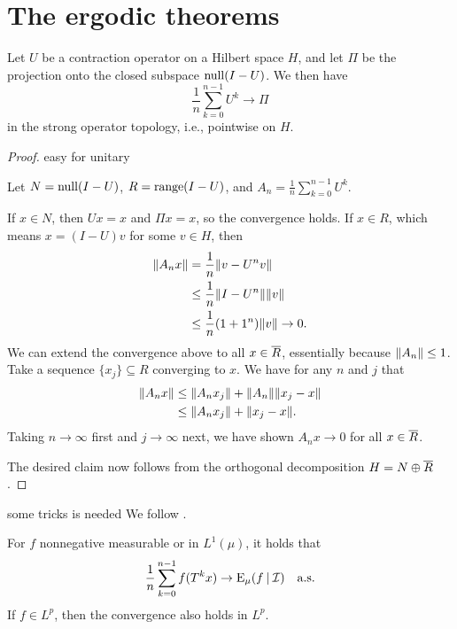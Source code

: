 \section{The ergodic theorems}

\begin{namedthm}
    Let $U$ be a contraction operator on a Hilbert space $H$, and let $\Pi$ be the projection onto the closed subspace $\operatorname{null}(I-U)$. We then have \[
        \frac{1}{n}\sum_{k=0}^{n-1} U^k \to \Pi
    \] in the strong operator topology, i.e., pointwise on $H$.
\end{namedthm}

\begin{proof}

    easy for unitary

    Let $N = \operatorname{null}(I - U)$, $R = \operatorname{range}(I - U)$, and $A_n = \frac{1}{n}\sum_{k=0}^{n-1} U^k$.

    If $x \in N$, then $Ux = x$ and $\Pi x = x$, so the convergence holds. If $x \in R$, which means $x = (I - U)v$ for some $v \in H$, then \begin{align*}
        \lVert A_n x \rVert & = \frac{1}{n}\lVert v - U^n v \rVert \\
        & \leq \frac{1}{n}\lVert I - U^n \rVert\lVert v \rVert\\
        & \leq \frac{1}{n}(1 + 1^n) \lVert v \rVert \to 0.
    \end{align*}
    We can extend the convergence above to all $x \in \overline{R}$, essentially because $\lVert A_n \rVert \leq 1$. Take a sequence $\{x_j\}\subseteq R$ converging to $x$. We have for any $n$ and $j$ that \begin{align*}
        \lVert A_n x \rVert & \leq \lVert A_n x_j \rVert + \lVert A_n \rVert\lVert x_j - x \rVert \\
        & \leq \lVert A_n x_j \rVert + \lVert x_j - x \rVert.
    \end{align*} Taking $n \to \infty$ first and $j \to \infty$ next, we have shown $A_n x \to 0$ for all $x \in \overline{R}$.

    The desired claim now follows from the orthogonal decomposition $H = N \oplus \overline{R}$.
\end{proof}

some tricks is needed We follow \cite[Lemma~14.1]{Taylor_2006}.

\begin{namedthm} \label{thm:Birkhoff-ergodic}
    For $f$ nonnegative measurable or in $L^1(\mu)$, it holds that \[
        \frac{1}{n} \sum_{k=0}^{n-1} f(T^kx) \to \mathop{}\!\mathrm{E}_\mu(f \mathbin{|} \mathcal I) \quad\text{a.s.}
    \] If $f \in L^p$, then the convergence also holds in $L^p$.
\end{namedthm}

